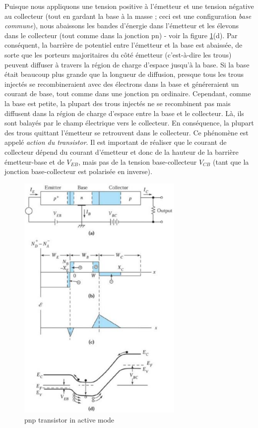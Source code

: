 Puisque nous appliquons une tension positive à l'émetteur et une tension négative au collecteur (tout en gardant la base à la masse ; ceci est une configuration \emph{base commune}), nous abaissons les bandes d'énergie dans l'émetteur et les élevons dans le collecteur (tout comme dans la jonction pn) - voir la figure \ref{fig:bjt3}(d). Par conséquent, la barrière de potentiel entre l'émetteur et la base est abaissée, de sorte que les porteurs majoritaires du côté émetteur (c'est-à-dire les trous) peuvent diffuser à travers la région de charge d'espace jusqu'à la base. Si la base était beaucoup plus grande que la longueur de diffusion, presque tous les trous injectés se recombineraient avec des électrons dans la base et généreraient un courant de base, tout comme dans une jonction pn ordinaire. Cependant, comme la base est petite, la plupart des trous injectés ne se recombinent pas mais diffusent dans la région de charge d'espace entre la base et le collecteur. Là, ils sont balayés par le champ électrique vers le collecteur. En conséquence, la plupart des trous quittant l'émetteur se retrouvent dans le collecteur. Ce phénomène est appelé \emph{action du transistor}. Il est important de réaliser que le courant de collecteur dépend du courant d'émetteur et donc de la hauteur de la barrière émetteur-base et de $V_{EB}$, mais pas de la tension base-collecteur $V_{CB}$ (tant que la jonction base-collecteur est polarisée en inverse).

\begin{figure}[h!]
\centering
\includegraphics[width=8cm]{figures/ch01/bjt3.jpg}
\caption{pnp transistor in active mode} 
\label{fig:bjt3}
\end{figure}

